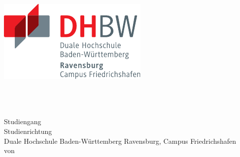 \thispagestyle{plain}
\hypersetup{pageanchor=false}
\begin{titlepage}
\enlargethispage{4.0cm}
\sffamily 								%

\parbox{0.5\linewidth}{
\begin{flushleft}
\end{flushleft}
}
\parbox{0.5\linewidth}{
\begin{flushright}
	\includegraphics[width=0.4\linewidth]{images/DHBW_d_R_FN_46mm_4c}\\[5ex]
\end{flushright}
}
				

\begin{center}

{\fontsize{20.74pt}{24pt}\selectfont
\textbf{\titel}\\[1.5ex]}
{\fontsize{14pt}{17pt}\selectfont
\textbf{\untertitel}\\[5ex]}
{\fontsize{17pt}{20pt}\selectfont
\textbf{\arbeit}\\[2ex]}
{\fontsize{14pt}{17pt}\selectfont
Studiengang \studiengang\\[2ex]}
{\fontsize{12pt}{14pt}\selectfont
Studienrichtung \studienrichtung\\[1ex]
Duale Hochschule Baden-Württemberg Ravensburg, Campus Friedrichshafen\\[5ex]
von\\[1ex]
\autor\\[15ex]}


\end{center}


\end{titlepage}
